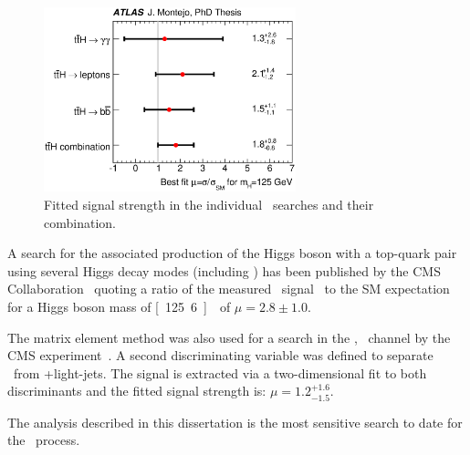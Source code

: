 \begin{figure}[bht!]
  \centering
  \includegraphics[trim=0cm 0.2cm 0cm 0.5cm, clip=true, width=0.65\textwidth]{Analysis/Figures_ttH/MuPlot_ttH_combo.eps}
  \caption{Fitted signal strength in the individual \ttH\ searches and their combination.}
  \label{fig:ttH_combo}
\end{figure}

A search for the 
associated production of the Higgs boson with a top-quark pair using  
several Higgs decay modes (including \htobb) has been published  
by the CMS Collaboration~\cite{CMS8TeVttH} quoting a ratio of the 
measured \tth\ signal \xsec\ to the SM expectation 
for a Higgs boson mass of \unit[125.6]{\gev} of $\mu = 2.8 \pm 1.0$.

The matrix element method was also used for a search in the \ttH, \htobb\ channel by the
CMS experiment~\cite{CMSMEM}. A second discriminating variable was defined to separate \ttHF\ from \ttbar+light-jets. The signal is extracted via a two-dimensional fit to both discriminants and the fitted signal strength is: $\mu = 1.2^{+1.6}_{-1.5}$.

The analysis described in this dissertation is the most sensitive search to date for the \ttH\ process.

\clearpage
